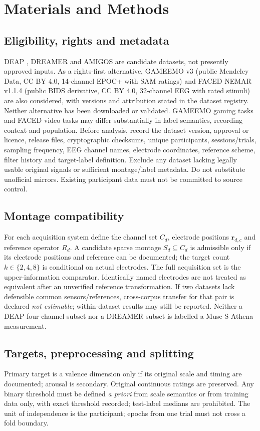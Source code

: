 \section{Materials and Methods}
\subsection{Eligibility, rights and metadata}
DEAP \cite{deap2012}, DREAMER \cite{dreamer2018} and AMIGOS \cite{amigos2021} are candidate datasets, not presently approved inputs. As a rights-first alternative, GAMEEMO v3 \cite{gameemo2020} (public Mendeley Data, CC BY 4.0, 14-channel EPOC+ with SAM ratings) and FACED NEMAR v1.1.4 \cite{faced2023} (public BIDS derivative, CC BY 4.0, 32-channel EEG with rated stimuli) are also considered, with versions and attribution stated in the dataset registry. Neither alternative has been downloaded or validated. GAMEEMO gaming tasks and FACED video tasks may differ substantially in label semantics, recording context and population. Before analysis, record the dataset version, approval or licence, release files, cryptographic checksums, unique participants, sessions/trials, sampling frequency, EEG channel names, electrode coordinates, reference scheme, filter history and target-label definition. Exclude any dataset lacking legally usable original signals or sufficient montage/label metadata. Do not substitute unofficial mirrors. Existing participant data must not be committed to source control.

\subsection{Montage compatibility}
For each acquisition system define the channel set $C_d$, electrode positions $\mathbf{r}_{d,c}$ and reference operator $R_d$. A candidate sparse montage $S_d \subseteq C_d$ is admissible only if its electrode positions and reference can be documented; the target count $k\in\{2,4,8\}$ is conditional on actual electrodes. The full acquisition set is the upper-information comparator. Identically named electrodes are not treated as equivalent after an unverified reference transformation. If two datasets lack defensible common sensors/references, cross-corpus transfer for that pair is declared \emph{not estimable}; within-dataset results may still be reported. Neither a DEAP four-channel subset nor a DREAMER subset is labelled a Muse S Athena measurement.

\subsection{Targets, preprocessing and splitting}
Primary target is a valence dimension only if its original scale and timing are documented; arousal is secondary. Original continuous ratings are preserved. Any binary threshold must be defined \emph{a priori} from scale semantics or from training data only, with exact threshold recorded; test-label medians are prohibited. The unit of independence is the participant; epochs from one trial must not cross a fold boundary.

